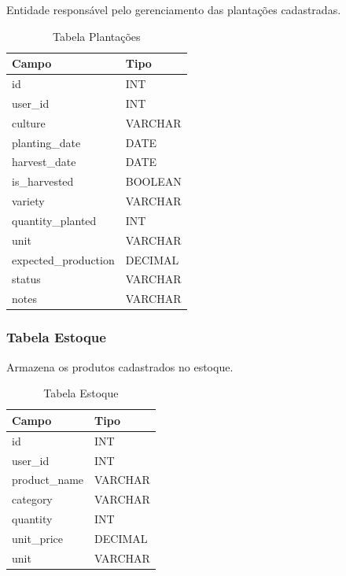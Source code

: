 \documentclass[12pt]{article}
\begin{document}
Entidade responsável pelo gerenciamento das plantações cadastradas.

\begin{table}[H]
  \centering
  \caption{Tabela Plantações}
  \begin{tabular}{|l|l|}
    \hline
    \textbf{Campo}       & \textbf{Tipo} \\ \hline
    id                   & INT           \\ \hline
    user\_id             & INT           \\ \hline
    culture              & VARCHAR       \\ \hline
    planting\_date       & DATE          \\ \hline
    harvest\_date        & DATE          \\ \hline
    is\_harvested        & BOOLEAN       \\ \hline
    variety              & VARCHAR       \\ \hline
    quantity\_planted    & INT           \\ \hline
    unit                 & VARCHAR       \\ \hline
    expected\_production & DECIMAL       \\ \hline
    status               & VARCHAR       \\ \hline
    notes                & VARCHAR       \\ \hline
  \end{tabular}
\end{table}

\subsubsection{Tabela Estoque}

Armazena os produtos cadastrados no estoque.

\begin{table}[H]
  \centering
  \caption{Tabela Estoque}
  \begin{tabular}{|l|l|}
    \hline
    \textbf{Campo} & \textbf{Tipo} \\ \hline
    id             & INT           \\ \hline
    user\_id       & INT           \\ \hline
    product\_name  & VARCHAR       \\ \hline
    category       & VARCHAR       \\ \hline
    quantity       & INT           \\ \hline
    unit\_price    & DECIMAL       \\ \hline
    unit           & VARCHAR       \\ \hline
  \end{tabular}
\end{table}
\end{document}
